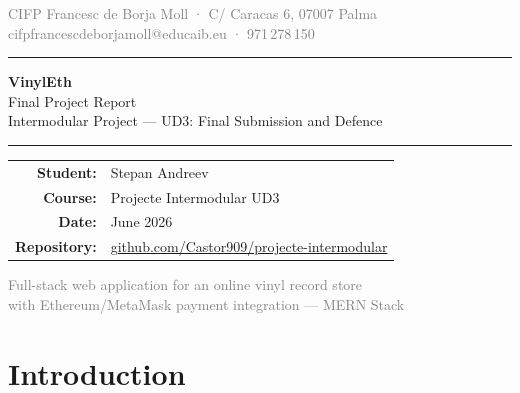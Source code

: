 \documentclass[11pt, a4paper]{report}
\begin{document}
\begin{titlepage}
  \thispagestyle{empty}
  \begin{center}
    \vspace*{1.5cm}

    {\sffamily\small\textcolor{gray}{CIFP Francesc de Borja Moll · C/ Caracas 6, 07007 Palma}\\
    \textcolor{gray}{cifpfrancescdeborjamoll@educaib.eu · 971\,278\,150}}

    \vspace{1.8cm}
    \textcolor{accent}{\rule{\linewidth}{1.5pt}}
    \vspace{0.6cm}

    {\sffamily\Huge\bfseries\color{accent} VinylEth}\\[0.4cm]
    {\sffamily\Large Final Project Report}\\[0.2cm]
    {\sffamily\normalsize\color{gray} Intermodular Project — UD3: Final Submission and Defence}

    \vspace{0.6cm}
    \textcolor{accent}{\rule{\linewidth}{1.5pt}}
    \vspace{2.2cm}

    \begin{tabular}{rl}
      \sffamily\textbf{Student:}   & \sffamily Stepan Andreev \\[4pt]
      \sffamily\textbf{Course:}    & \sffamily Projecte Intermodular UD3 \\[4pt]
      \sffamily\textbf{Date:}      & \sffamily June 2026 \\[4pt]
      \sffamily\textbf{Repository:} & \sffamily\small
        \href{https://github.com/Castor909/projecte-intermodular}{github.com/Castor909/projecte-intermodular} \\
    \end{tabular}

    \vfill

    {\sffamily\small\textcolor{gray}{Full-stack web application for an online vinyl record store\\
    with Ethereum/MetaMask payment integration — MERN Stack}}
  \end{center}
\end{titlepage}

\tableofcontents
\thispagestyle{empty}

\chapter{Introduction}
\end{document}
